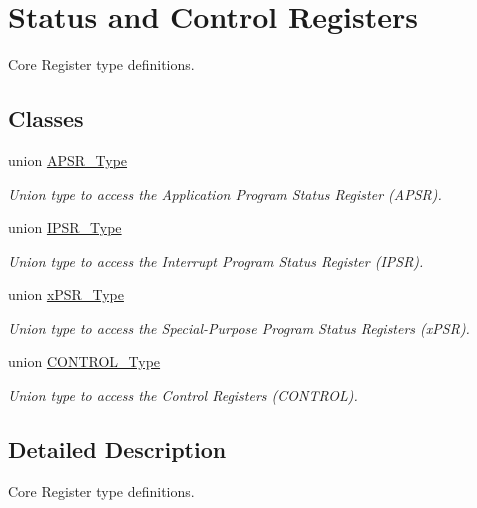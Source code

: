 \hypertarget{group___c_m_s_i_s___c_o_r_e}{}\section{Status and Control Registers}
\label{group___c_m_s_i_s___c_o_r_e}


Core Register type definitions.  


\subsection*{Classes}
\begin{DoxyCompactItemize}
\item 
union \hyperlink{union_a_p_s_r___type}{A\+P\+S\+R\+\_\+\+Type}
\begin{DoxyCompactList}\small\item\em Union type to access the Application Program Status Register (A\+P\+S\+R). \end{DoxyCompactList}\item 
union \hyperlink{union_i_p_s_r___type}{I\+P\+S\+R\+\_\+\+Type}
\begin{DoxyCompactList}\small\item\em Union type to access the Interrupt Program Status Register (I\+P\+S\+R). \end{DoxyCompactList}\item 
union \hyperlink{unionx_p_s_r___type}{x\+P\+S\+R\+\_\+\+Type}
\begin{DoxyCompactList}\small\item\em Union type to access the Special-\/\+Purpose Program Status Registers (x\+P\+S\+R). \end{DoxyCompactList}\item 
union \hyperlink{union_c_o_n_t_r_o_l___type}{C\+O\+N\+T\+R\+O\+L\+\_\+\+Type}
\begin{DoxyCompactList}\small\item\em Union type to access the Control Registers (C\+O\+N\+T\+R\+O\+L). \end{DoxyCompactList}\end{DoxyCompactItemize}


\subsection{Detailed Description}
Core Register type definitions. 

